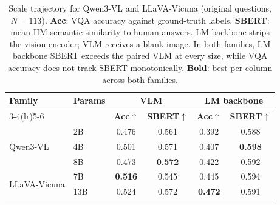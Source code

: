 \begin{table}[t]
\centering\small
\setlength{\tabcolsep}{4pt}

\caption{Scale trajectory for Qwen3-VL and LLaVA-Vicuna (original questions, $N{=}113$). \textbf{Acc}: VQA accuracy against ground-truth labels. \textbf{SBERT}: mean HM semantic similarity to human answers. LM backbone strips the vision encoder; VLM receives a blank image. In both families, LM backbone SBERT exceeds the paired VLM at every size, while VQA accuracy does not track SBERT monotonically. \textbf{Bold}: best per column across both families.}
\label{tab:scale_trajectory_qwen3vl}
\begin{tabular}{llcccc}
\toprule
\multirow{2}{*}{\textbf{Family}} & \multirow{2}{*}{\textbf{Params}} &
\multicolumn{2}{c}{\textbf{VLM}} & \multicolumn{2}{c}{\textbf{LM backbone}} \\
\cmidrule(lr){3-4}\cmidrule(lr){5-6}
& & \textbf{Acc}$\uparrow$ & \textbf{SBERT}$\uparrow$ & \textbf{Acc}$\uparrow$ & \textbf{SBERT}$\uparrow$ \\
\midrule
\multirow{3}{*}{Qwen3-VL} & 2B & 0.476 & 0.561 & 0.392 & 0.588 \\
 & 4B & 0.501 & 0.571 & 0.407 & \textbf{0.598} \\
 & 8B & 0.473 & \textbf{0.572} & 0.422 & 0.592 \\
\midrule
\multirow{2}{*}{LLaVA-Vicuna} & 7B  & \textbf{0.516} & 0.545 & 0.445 & 0.594 \\
 & 13B & 0.524 & 0.572 & \textbf{0.472} & 0.591 \\
\bottomrule
\end{tabular}
\end{table}
